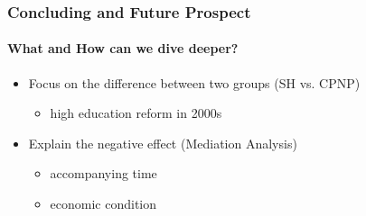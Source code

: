 \documentclass{beamer}
\begin{document}
\begin{frame} %
\frametitle{Concluding and Future Prospect}
\framesubtitle{What and How can we dive deeper?}

    \begin{itemize}
        \item Focus on the difference between two groups (SH vs. CPNP)
        \begin{itemize}
        \item high education reform in 2000s
        \end{itemize}
        \item Explain the negative effect (Mediation Analysis)
        \begin{itemize}
        \item accompanying time
        \item economic condition
        \end{itemize}
    \end{itemize}

\end{frame}
\end{document}
